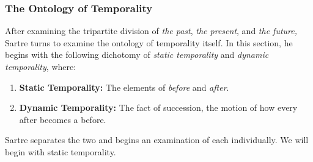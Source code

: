 \subsubsection{The Ontology of Temporality}

After examining the tripartite division of \emph{the past}, \emph{the present}, and \emph{the future,} Sartre turns to examine the ontology of temporality itself. In this section, he begins with the following dichotomy of \emph{static temporality} and \emph{dynamic temporality}, where:

\begin{enumerate}
    \item \textbf{Static Temporality:} The elements of \emph{before} and \emph{after}.


    \item \textbf{Dynamic Temporality:} The fact of succession, the motion of how every after becomes a before.

\end{enumerate}

\noindent
Sartre separates the two and begins an examination of each individually. We will begin with static temporality.


